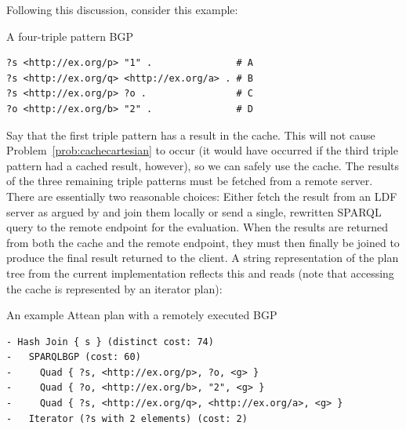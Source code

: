 Following this discussion, consider this example:
\begin{example}{A four-triple pattern BGP}\label{ex:bgp4}
\begin{verbatim}
?s <http://ex.org/p> "1" .               # A
?s <http://ex.org/q> <http://ex.org/a> . # B
?s <http://ex.org/p> ?o .                # C
?o <http://ex.org/b> "2" .               # D
\end{verbatim}
\end{example}
Say that the first triple pattern has a result in the cache. This will
not cause Problem~\ref{prob:cachecartesian} to occur (it would have
occurred if the third triple pattern had a cached result, however), so
we can safely use the cache. The results of the three remaining triple
patterns must be fetched from a remote server. There are essentially
two reasonable choices: Either fetch the result from an LDF server as
argued by \cite{verborgh2014querying} and join them locally or send a
single, rewritten SPARQL query to the remote endpoint for the
evaluation. When the results are returned from both the cache and the
remote endpoint, they must then finally be joined to produce the final
result returned to the client. A string representation of the plan
tree from the current implementation reflects this and reads (note
that accessing the cache is represented by an iterator plan):
\begin{example}{An example Attean plan with a remotely executed BGP}
\small
\begin{verbatim}
- Hash Join { s } (distinct cost: 74)
-   SPARQLBGP (cost: 60)
-     Quad { ?s, <http://ex.org/p>, ?o, <g> }
-     Quad { ?o, <http://ex.org/b>, "2", <g> }
-     Quad { ?s, <http://ex.org/q>, <http://ex.org/a>, <g> }
-   Iterator (?s with 2 elements) (cost: 2)
\end{verbatim}
\normalsize
\end{example}

